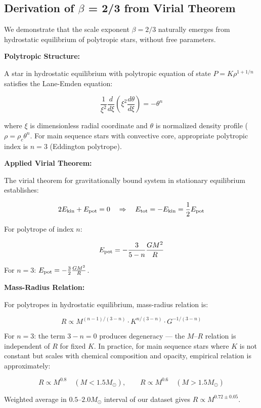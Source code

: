 \documentclass[11pt,a4paper]{article}
\begin{document}
\hypertarget{a.1-derivation-of-ux3b2-23-from-virial-theorem}{%
\subsection*{Derivation of $\beta$ = 2/3 from Virial
Theorem}\label{a.1-derivation-of-ux3b2-23-from-virial-theorem}}

We demonstrate that the scale exponent \(\beta = 2/3\) naturally emerges
from hydrostatic equilibrium of polytropic stars, without free
parameters.

\textbf{Polytropic Structure:}

A star in hydrostatic equilibrium with polytropic equation of state
\(P = K\rho^{1+1/n}\) satisfies the Lane-Emden equation:

\[\frac{1}{\xi^2}\frac{d}{d\xi}\left(\xi^2 \frac{d\theta}{d\xi}\right) = -\theta^n\]

where \(\xi\) is dimensionless radial coordinate and \(\theta\) is
normalized density profile (\(\rho = \rho_c \theta^n\). For main
sequence stars with convective core, appropriate polytropic index is
\(n = 3\) (Eddington polytrope).

\textbf{Applied Virial Theorem:}

The virial theorem for gravitationally bound system in stationary
equilibrium establishes:

\[2E_{\rm kin} + E_{\rm pot} = 0 \quad \Rightarrow \quad E_{\rm tot} = -E_{\rm kin} = \frac{1}{2}E_{\rm pot}\]

For polytrope of index \(n\):

\[E_{\rm pot} = -\frac{3}{5-n}\frac{GM^2}{R}\]

For \(n=3\): \(E_{\rm pot} = -\frac{3}{2}\frac{GM^2}{R}\).

\textbf{Mass-Radius Relation:}

For polytropes in hydrostatic equilibrium, mass-radius relation is:

\[R \propto M^{(n-1)/(3-n)} \cdot K^{n/(3-n)} \cdot G^{-1/(3-n)}\]

For \(n=3\): the term \(3-n = 0\) produces degeneracy --- the
\(M\)--\(R\) relation is independent of \(R\) for fixed \(K\). In
practice, for main sequence stars where \(K\) is not constant but scales
with chemical composition and opacity, empirical relation is
approximately:

\[R \propto M^{0.8} \quad (M < 1.5 M_\odot), \qquad R \propto M^{0.6} \quad (M > 1.5 M_\odot)\]

Weighted average in \(0.5\)--\(2.0 M_\odot\) interval of our dataset
gives \(R \propto M^{0.72 \pm 0.05}\).
\end{document}
